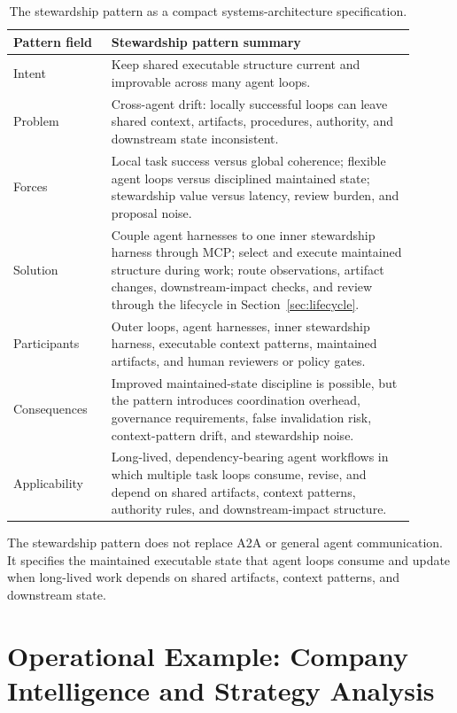 \documentclass{article}
\begin{document}
\begin{table}[t]
\centering
\small
\begin{tabular}{p{0.22\linewidth}p{0.68\linewidth}}
\toprule
\textbf{Pattern field} & \textbf{Stewardship pattern summary} \\
\midrule
Intent & Keep shared executable structure current and improvable across many agent loops. \\
Problem & Cross-agent drift: locally successful loops can leave shared context, artifacts, procedures, authority, and downstream state inconsistent. \\
Forces & Local task success versus global coherence; flexible agent loops versus disciplined maintained state; stewardship value versus latency, review burden, and proposal noise. \\
Solution & Couple agent harnesses to one inner stewardship harness through MCP; select and execute maintained structure during work; route observations, artifact changes, downstream-impact checks, and review through the lifecycle in Section~\ref{sec:lifecycle}. \\
Participants & Outer loops, agent harnesses, inner stewardship harness, executable context patterns, maintained artifacts, and human reviewers or policy gates. \\
Consequences & Improved maintained-state discipline is possible, but the pattern introduces coordination overhead, governance requirements, false invalidation risk, context-pattern drift, and stewardship noise. \\
Applicability & Long-lived, dependency-bearing agent workflows in which multiple task loops consume, revise, and depend on shared artifacts, context patterns, authority rules, and downstream-impact structure. \\
\bottomrule
\end{tabular}
\caption{The stewardship pattern as a compact systems-architecture specification.}
\label{tab:pattern-summary}
\end{table}

The stewardship pattern does not replace A2A or general agent communication. It specifies the maintained executable state that agent loops consume and update when long-lived work depends on shared artifacts, context patterns, and downstream state.

\section{Operational Example: Company Intelligence and Strategy Analysis}
\end{document}
